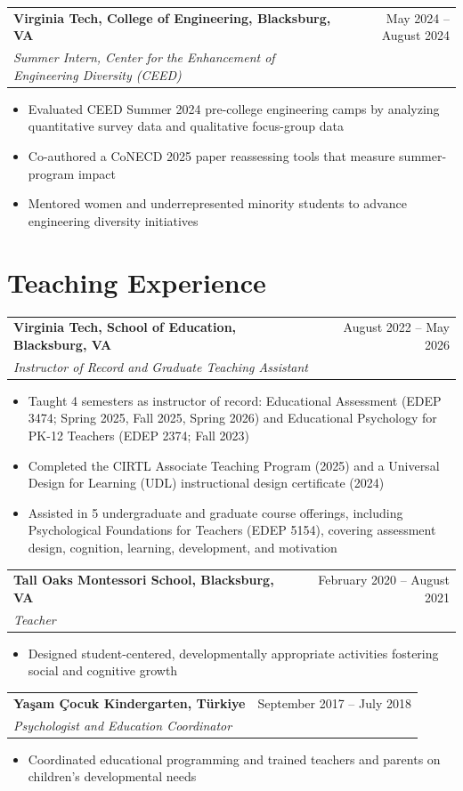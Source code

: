 \documentclass[letterpaper,11pt]{article}
\makeatletter
\newcommand{\entry}[4]{%
  \begin{tabular*}{\linewidth}[t]{@{}l@{\extracolsep{\fill}}r@{}}
    \textbf{#1} & #2 \\
    \textit{#3} & \textit{#4} \\
  \end{tabular*}\par\vspace{1pt}}
\newenvironment{bullets}%
  {\begin{itemize}[leftmargin=1.2em, itemsep=0pt, parsep=0pt, topsep=1pt, label=\textbullet]}%
  {\end{itemize}\vspace{2pt}}
\makeatother
\begin{document}
\entry{Virginia Tech, College of Engineering, Blacksburg, VA}{May 2024 -- August 2024}
      {Summer Intern, Center for the Enhancement of Engineering Diversity (CEED)}{}
\begin{bullets}
  \item Evaluated CEED Summer 2024 pre-college engineering camps by analyzing quantitative survey data and qualitative focus-group data
  \item Co-authored a CoNECD 2025 paper reassessing tools that measure summer-program impact
  \item Mentored women and underrepresented minority students to advance engineering diversity initiatives
\end{bullets}

\section{Teaching Experience}
\entry{Virginia Tech, School of Education, Blacksburg, VA}{August 2022 -- May 2026}
      {Instructor of Record and Graduate Teaching Assistant}{}
\begin{bullets}
  \item Taught 4 semesters as instructor of record: Educational Assessment (EDEP 3474; Spring 2025, Fall 2025, Spring 2026) and Educational Psychology for PK-12 Teachers (EDEP 2374; Fall 2023)
  \item Completed the CIRTL Associate Teaching Program (2025) and a Universal Design for Learning (UDL) instructional design certificate (2024)
  \item Assisted in 5 undergraduate and graduate course offerings, including Psychological Foundations for Teachers (EDEP 5154), covering assessment design, cognition, learning, development, and motivation
\end{bullets}

\entry{Tall Oaks Montessori School, Blacksburg, VA}{February 2020 -- August 2021}
      {Teacher}{}
\begin{bullets}
  \item Designed student-centered, developmentally appropriate activities fostering social and cognitive growth
\end{bullets}

\entry{Yaşam Çocuk Kindergarten, Türkiye}{September 2017 -- July 2018}
      {Psychologist and Education Coordinator}{}
\begin{bullets}
  \item Coordinated educational programming and trained teachers and parents on children's developmental needs
\end{bullets}
\end{document}
